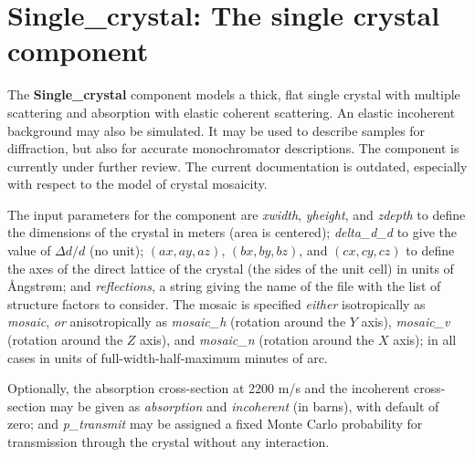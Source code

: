 \section{Single\_crystal: The single crystal component}
\label{s:Single_crystal}


The {\bf Single\_crystal} component models a thick, flat single crystal
with multiple scattering and absorption with elastic coherent scattering.
An elastic incoherent background may also be simulated.
It may be used to describe samples for diffraction,
but also for accurate monochromator descriptions.
The component is currently under further review. The current documentation is outdated, especially with respect to the model of crystal mosaicity.

The input parameters for the component are \textit{xwidth},
\textit{yheight}, and \textit{zdepth} to define the dimensions of the
crystal in meters (area is centered); \textit{delta\_d\_d} to give the
value of $\Delta d/d$ (no unit);
$(\textit{ax}, \textit{ay}, \textit{az})$, $(\textit{bx}, \textit{by},
\textit{bz})$, and $(\textit{cx}, \textit{cy}, \textit{cz})$ to define
the axes of the direct lattice of the crystal (the sides of the unit
cell) in units of {\AA}ngstr{\o}m; and \textit{reflections}, a string
giving the name of the file with the list of structure factors to
consider.
The mosaic is specified \emph{either} isotropically as
\textit{mosaic}, \emph{or} anisotropically as \textit{mosaic\_h}
(rotation around the $Y$ axis), \textit{mosaic\_v} (rotation around the
$Z$ axis), and \textit{mosaic\_n} (rotation around the $X$ axis); in all
cases in units of full-width-half-maximum minutes of arc.

Optionally, the absorption cross-section at 2200 m/s and the incoherent
cross-section may be given as \textit{absorption} and
\textit{incoherent} (in barns), with default of zero; and
\textit{p\_transmit} may be assigned a fixed Monte Carlo probability for
transmission through the crystal without any interaction.

